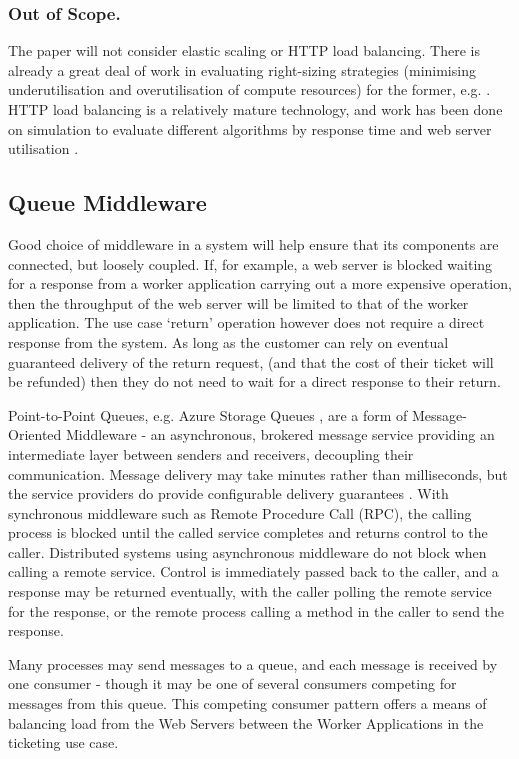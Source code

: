 \documentclass[runningheads]{llncs}
\begin{document}
\subsubsection{Out of Scope.}  The paper will not consider elastic scaling or HTTP load balancing.  There is already a great deal of work in evaluating right-sizing strategies (minimising underutilisation and overutilisation of compute resources) for the former, e.g. \cite{RN49,RN62,RN48}.  HTTP load balancing is a relatively mature technology, and work has been done on simulation to evaluate different algorithms by response time and web server utilisation \cite{RN55}.

%
%

\subsection{Queue Middleware}\label{sec:middleware}

Good choice of middleware in a system will help ensure that its components are connected, but loosely coupled.  If, for example, a web server is blocked waiting for a response from a worker application carrying out a more expensive operation, then the throughput of the web server will be limited to that of the worker application.  The use case `return' operation however does not require a direct response from the system.  As long as the customer can rely on eventual guaranteed delivery of the return request, (and that the cost of their ticket will be refunded) then they do not need to wait for a direct response to their return.

Point-to-Point Queues, e.g. Azure Storage Queues \cite{RN1072}, are a form of Message-Oriented Middleware - an asynchronous, brokered message service providing an intermediate layer between senders and receivers, decoupling their communication.  Message delivery may take minutes rather than milliseconds, but the service providers do provide configurable delivery guarantees \cite{RN65}.  With synchronous middleware such as Remote Procedure Call (RPC), the calling process is blocked until the called service completes and returns control to the caller.  Distributed systems using asynchronous middleware do not block when calling a remote service.  Control is immediately passed back to the caller, and a response may be returned eventually, with the caller polling the remote service for the response, or the remote process calling a method in the caller to send the response.

Many processes may send messages to a queue, and each message is received by one consumer - though it may be one of several consumers competing for messages from this queue.  This competing consumer pattern offers a means of balancing load from the Web Servers between the Worker Applications in the ticketing use case.
\end{document}
